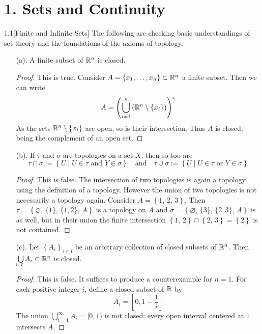 \section*{1. Sets and Continuity}

\begin{cusques}{1.1}[Finite and Infinite Sets] The following are checking basic understandings of set theory and the foundations of the axioms of topology.
\begin{enumerate}
    \item[(a).] A finite subset of $\mathbb{R}^n$ is closed.
    \begin{proof}
        This is true. Consider $A = \left\{x_1, \dots, x_n\right\} \subset \mathbb{R}^n$ a finite subset. Then we can write 
            $$A = \left(\bigcup_{i=1}^{n}\left(\mathbb{R}^n \setminus \left\{x_i\right\}\right)\right)^c$$
        As the sets $\mathbb{R}^n\setminus\left\{x_i\right\}$ are open, so is their intersection. Thus $A$ is closed, being the complement of an open set.
    \end{proof}
    \item[(b).] If $\tau$ and $\sigma$ are topologies on a set $X$, then so too are
    $$\tau \cap \sigma := \left\{U \mid U \in \tau \text{ and } Y \in \sigma\right\} \,\,\,\,\text{ and }\,\,\,\, \tau \cup \sigma := \left\{U \mid U \in \tau \text{ or } Y \in \sigma\right\}$$
    \begin{proof}
        This is false. The intersection of two topologies is again a topology using the definition of a topology. However the union of two topologies is not necessarily a topology again. Consider $A = \left\{1,\, 2,\, 3\right\}$. Then $\tau = \left\{\varnothing,\, \{1\},\, \{1, 2\},\, A \right\}$ is a topology on $A$ and $\sigma = \left\{\varnothing,\, \{3\},\, \{2, 3\},\, A \right\}$ is as well, but in their union the finite intersection $\left\{1,\, 2\right\} \cap \left\{2,\, 3\right\} = \left\{2\right\}$ is not contained.
    \end{proof}
    \item[(c).] Let $\left\{A_i\right\}_{i \in I}$ be an arbitrary collection of closed subsets of $\mathbb{R}^n$. Then $\underaccent{i \in I}{\bigcup}A_i \subset \R^n$ is closed.
    \begin{proof}
        This is false. It suffices to produce a counterexample for $n =1$. For each positive integer $i$, define a closed subset of $\mathbb{R}$ by 
            $$A_i = \left[0, 1 - \dfrac{1}{i}\right]$$
        The union $\bigcup\limits_{i=1}^{\infty} A_i = [0, 1)$ is not closed: every open interval centered at $1$ intersects $A$.
    \end{proof}
\end{enumerate}
\end{cusques}


